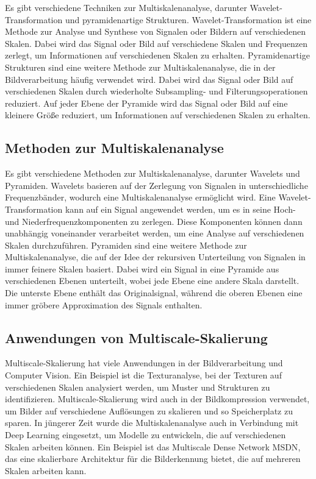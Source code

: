         Es gibt verschiedene Techniken zur Multiskalenanalyse, darunter Wavelet-Transformation und pyramidenartige Strukturen.      
        Wavelet-Transformation ist eine Methode zur Analyse und Synthese von Signalen oder Bildern auf verschiedenen Skalen.      
        Dabei wird das Signal oder Bild auf verschiedene Skalen und Frequenzen zerlegt, um Informationen auf verschiedenen Skalen zu erhalten.
        Pyramidenartige Strukturen sind eine weitere Methode zur Multiskalenanalyse, die in der Bildverarbeitung häufig verwendet wird.      
        Dabei wird das Signal oder Bild auf verschiedenen Skalen durch wiederholte Subsampling- und Filterungsoperationen reduziert.      
        Auf jeder Ebene der Pyramide wird das Signal oder Bild auf eine kleinere Größe reduziert, um Informationen auf verschiedenen Skalen zu erhalten.
    
    \subsection{Methoden zur Multiskalenanalyse}
        Es gibt verschiedene Methoden zur Multiskalenanalyse, darunter Wavelets und Pyramiden.      
        Wavelets basieren auf der Zerlegung von Signalen in unterschiedliche Frequenzbänder, wodurch eine Multiskalenanalyse ermöglicht wird.      
        Eine Wavelet-Transformation kann auf ein Signal angewendet werden, um es in seine Hoch- und Niederfrequenzkomponenten zu zerlegen.      
        Diese Komponenten können dann unabhängig voneinander verarbeitet werden, um eine Analyse auf verschiedenen Skalen durchzuführen.
        Pyramiden sind eine weitere Methode zur Multiskalenanalyse, die auf der Idee der rekursiven Unterteilung von Signalen in immer feinere Skalen basiert.      Dabei wird ein Signal in eine Pyramide aus verschiedenen Ebenen unterteilt, wobei jede Ebene eine andere Skala darstellt.      
        Die unterste Ebene enthält das Originalsignal, während die oberen Ebenen eine immer gröbere Approximation des Signals enthalten.
    
    \subsection{Anwendungen von Multiscale-Skalierung}
        Multiscale-Skalierung hat viele Anwendungen in der Bildverarbeitung und Computer Vision.
        Ein Beispiel ist die Texturanalyse, bei der Texturen auf verschiedenen Skalen analysiert werden, um Muster und Strukturen zu identifizieren.      
        Multiscale-Skalierung wird auch in der Bildkompression verwendet, um Bilder auf verschiedene Auflösungen zu skalieren und so Speicherplatz zu sparen.
        In jüngerer Zeit wurde die Multiskalenanalyse auch in Verbindung mit Deep Learning eingesetzt, um Modelle zu entwickeln, die auf verschiedenen Skalen arbeiten können.      
        Ein Beispiel ist das Multiscale Dense Network \ac{MSDN}, das eine skalierbare Architektur für die Bilderkennung bietet, die auf mehreren Skalen arbeiten kann.
    
